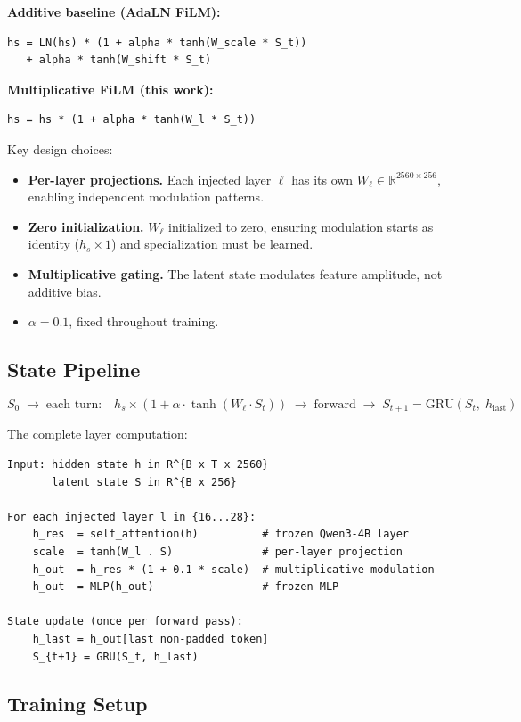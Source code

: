 \documentclass[11pt,a4paper]{article}
\newcommand{\R}{\mathbb{R}}
\newcommand{\St}{S_t}
\newcommand{\Stp}{S_{t+1}}
\begin{document}
\textbf{Additive baseline (AdaLN FiLM):}
\begin{lstlisting}
hs = LN(hs) * (1 + alpha * tanh(W_scale * S_t))
   + alpha * tanh(W_shift * S_t)
\end{lstlisting}

\textbf{Multiplicative FiLM (this work):}
\begin{lstlisting}
hs = hs * (1 + alpha * tanh(W_l * S_t))
\end{lstlisting}

Key design choices:
\begin{itemize}
  \item \textbf{Per-layer projections.} Each injected layer $\ell$ has its own
    $W_\ell \in \R^{2560 \times 256}$, enabling independent modulation patterns.
  \item \textbf{Zero initialization.} $W_\ell$ initialized to zero, ensuring
    modulation starts as identity ($h_s \times 1$) and specialization must be learned.
  \item \textbf{Multiplicative gating.} The latent state modulates feature amplitude,
    not additive bias.
  \item $\alpha = 0.1$, fixed throughout training.
\end{itemize}

\subsection{State Pipeline}

$$S_0 \;\to\; \text{each turn:}\quad h_s \times (1 + \alpha\cdot\tanh(W_\ell \cdot \St)) \;\to\; \mathrm{forward} \;\to\; \Stp = \mathrm{GRU}(\St,\; h_{\mathrm{last}})$$

The complete layer computation:

\begin{lstlisting}
Input: hidden state h in R^{B x T x 2560}
       latent state S in R^{B x 256}

For each injected layer l in {16...28}:
    h_res  = self_attention(h)          # frozen Qwen3-4B layer
    scale  = tanh(W_l . S)              # per-layer projection
    h_out  = h_res * (1 + 0.1 * scale)  # multiplicative modulation
    h_out  = MLP(h_out)                 # frozen MLP

State update (once per forward pass):
    h_last = h_out[last non-padded token]
    S_{t+1} = GRU(S_t, h_last)
\end{lstlisting}

\subsection{Training Setup}
\end{document}

